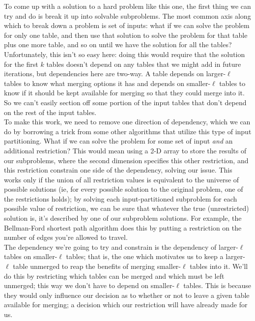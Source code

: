 \documentclass{article}[12]
\begin{document}
To come up with a solution to a hard problem like this one, the first thing we can try and do is break it up into solvable subproblems. The most common axis along which to break down a problem is set of inputs: what if we can solve the problem for only one table, and then use that solution to solve the problem for that table plus one more table, and so on until we have the solution for all the tables? Unfortunately, this isn't so easy here: doing this would require that the solution for the first $k$ tables doesn't depend on any tables that we might add in future iterations, but dependencies here are two-way. A table depends on larger-$\ell$ tables to know what merging options it has and depends on smaller-$\ell$ tables to know if it should be kept available for merging so that they could merge into it. So we can't easily section off some portion of the input tables that don't depend on the rest of the input tables.\\

To make this work, we need to remove one direction of dependency, which we can do by borrowing a trick from some other algorithms that utilize this type of input partitioning. What if we can solve the problem for some set of input \textit{and} an additional restriction? This would mean using a 2-D array to store the results of our subproblems, where the second dimension specifies this other restriction, and this restriction constrain one side of the dependency, solving our issue. This works only if the union of all restriction values is equivalent to the universe of possible solutions (ie, for every possible solution to the original problem, one of the restrictions holds); by solving each input-partitioned subproblem for each possible value of restriction, we can be sure that whatever the true (unrestricted) solution is, it's described by one of our subproblem solutions. For example, the Bellman-Ford shortest path algorithm does this by putting a restriction on the number of edges you're allowed to travel.\\

The dependency we're going to try and constrain is the dependency of larger-$\ell$ tables on smaller-$\ell$ tables; that is, the one which motivates us to keep a larger-$\ell$ table unmerged to reap the benefits of merging smaller-$\ell$ tables into it. We'll do this by restricting which tables can be merged and which must be left unmerged; this way we don't have to depend on smaller-$\ell$ tables. This is because they would only influence our decision as to whether or not to leave a given table available for merging; a decision which our restriction will have already made for us.\\
\end{document}
